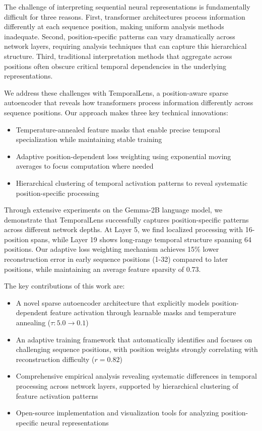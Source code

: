\documentclass{article} %
\begin{document}
The challenge of interpreting sequential neural representations is fundamentally difficult for three reasons. First, transformer architectures \cite{vaswani2017attention} process information differently at each sequence position, making uniform analysis methods inadequate. Second, position-specific patterns can vary dramatically across network layers, requiring analysis techniques that can capture this hierarchical structure. Third, traditional interpretation methods that aggregate across positions often obscure critical temporal dependencies in the underlying representations.

We address these challenges with TemporalLens, a position-aware sparse autoencoder that reveals how transformers process information differently across sequence positions. Our approach makes three key technical innovations:

\begin{itemize}
    \item Temperature-annealed feature masks that enable precise temporal specialization while maintaining stable training
    \item Adaptive position-dependent loss weighting using exponential moving averages to focus computation where needed
    \item Hierarchical clustering of temporal activation patterns to reveal systematic position-specific processing
\end{itemize}

Through extensive experiments on the Gemma-2B language model, we demonstrate that TemporalLens successfully captures position-specific patterns across different network depths. At Layer 5, we find localized processing with 16-position spans, while Layer 19 shows long-range temporal structure spanning 64 positions. Our adaptive loss weighting mechanism achieves 15\% lower reconstruction error in early sequence positions (1-32) compared to later positions, while maintaining an average feature sparsity of 0.73.

The key contributions of this work are:

\begin{itemize}
    \item A novel sparse autoencoder architecture that explicitly models position-dependent feature activation through learnable masks and temperature annealing ($\tau: 5.0 \rightarrow 0.1$)
    \item An adaptive training framework that automatically identifies and focuses on challenging sequence positions, with position weights strongly correlating with reconstruction difficulty ($r=0.82$)
    \item Comprehensive empirical analysis revealing systematic differences in temporal processing across network layers, supported by hierarchical clustering of feature activation patterns
    \item Open-source implementation and visualization tools for analyzing position-specific neural representations
\end{itemize}
\end{document}
